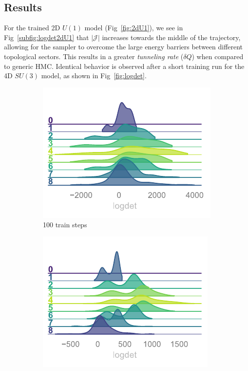 \documentclass[a4paper,11pt]{article}
\begin{document}
\subsection{\label{sec:results}Results}
%
For the trained 2D $U(1)$ model (Fig~\ref{fig:2dU1}), we see in Fig~\ref{subfig:logdet2dU1} that 
%
$\left|\mathcal{J}\right|$
%
increases towards the middle of the trajectory, allowing for the sampler to overcome the large energy barriers between different topological sectors.
%
This results in a greater \emph{tunneling rate} ($\delta Q$) when compared to generic HMC.
%
Identical behavior is observed after a short training run for the 4D $SU(3)$ model, as shown in Fig~\ref{fig:logdet}.
%
\begin{figure}[htpb!]
    \centering
    \begin{subfigure}{0.31\textwidth}
        \includegraphics[width=\textwidth]{assets/logdet-1.pdf}
        \caption{\label{subfig:logdet1} 100 train steps}
    \end{subfigure}
    \hfill
    \begin{subfigure}{0.31\textwidth}
        \includegraphics[width=\textwidth]{assets/logdet-2.pdf}

\end{subfigure}
\end{figure}
\end{document}
